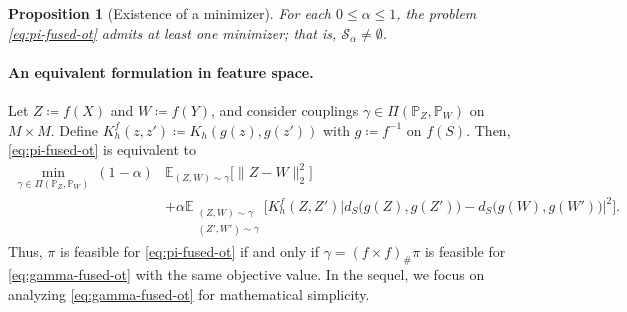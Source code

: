 \documentclass{article}
\newtheorem{proposition}{Proposition}
\begin{document}
\begin{proposition}[Existence of a minimizer]
	\label{prop:existence}
	For each $0\le \alpha\le 1$, the problem \eqref{eq:pi-fused-ot} admits at least one minimizer; that is, $\mathcal{S}_\alpha\neq\emptyset$.
\end{proposition}


\paragraph{An equivalent formulation in feature space.}
Let $Z\coloneqq f(X)$ and $W \coloneqq f(Y)$, and consider couplings $\gamma\in\Pi(\mathbb{P}_Z,\mathbb{P}_W)$ on $M\times M$. 
Define $K_h^f(z,z')\coloneqq K_h(g(z),g(z'))$ with $g \coloneqq f^{-1}$ on $f(S)$. 
Then, \eqref{eq:pi-fused-ot} is equivalent to
\begin{align}
	\label{eq:gamma-fused-ot}
	\min_{\gamma\in\Pi(\mathbb{P}_Z,\mathbb{P}_W)}\ 
	(1-\alpha)&\mathbb{E}_{(Z,W)\sim\gamma}\big[\|Z-W\|_2^2\big] \nonumber\\
	&+ \alpha\mathbb{E}_{\substack{(Z,W)\sim\gamma\\(Z',W')\sim\gamma}}
	\!\Big[K_h^f(Z,Z')\big|d_S\big(g(Z),g(Z')\big)-d_S\big(g(W),g(W')\big)\big|^2\Big].
\end{align}
Thus, $\pi$ is feasible for \eqref{eq:pi-fused-ot} if and only if $\gamma=(f\times f)_\#\pi$ is feasible for \eqref{eq:gamma-fused-ot} with the same objective value. In the sequel, we focus on analyzing \eqref{eq:gamma-fused-ot} for mathematical simplicity. 








\end{document}
